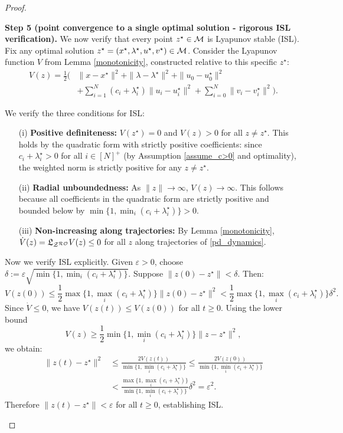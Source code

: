 \documentclass[journal,twoside,web]{ieeecolor}
\newcommand{\purpletext}[1]{\textcolor{proofpurple}{#1}}
\begin{document}
\begin{proof}
\purpletext{\textbf{Step 5 (point convergence to a single optimal solution - rigorous ISL verification).}
We now verify that every point $z^\star \in {\cal M}$ is Lyapunov stable (ISL). Fix any optimal solution $z^\star = (x^\star, \lambda^\star, u^\star, v^\star) \in {\cal M}$.
Consider the Lyapunov function $V$ from Lemma \ref{monotonicity}, constructed relative to this specific $z^\star$:
\begin{align*}
V(z) = \frac{1}{2}\Big(&\|x-x^\star\|^2 + \|\lambda-\lambda^\star\|^2 + \|u_0-u_0^\star\|^2\\
&+ \sum_{i=1}^N(c_i+\lambda_i^\star) \|u_i-u_i^\star\|^2 + \sum_{i=0}^N\|v_i-v_i^\star\|^2\Big).
\end{align*}

We verify the three conditions for ISL:
\begin{enumerate}
\item[(i)] \purpletext{\textbf{Positive definiteness:} $V(z^\star) = 0$ and $V(z) > 0$ for all $z \neq z^\star$. This holds by the quadratic form with strictly positive coefficients: since $c_i + \lambda_i^\star > 0$ for all $i \in [N]^+$ (by Assumption \ref{assume_c>0} and optimality), the weighted norm is strictly positive for any $z \neq z^\star$.}

\item[(ii)] \purpletext{\textbf{Radial unboundedness:} As $\|z\| \to \infty$, $V(z) \to \infty$. This follows because all coefficients in the quadratic form are strictly positive and bounded below by $\min\{1, \min_{i}(c_i + \lambda_i^\star)\} > 0$.}

\item[(iii)] \purpletext{\textbf{Non-increasing along trajectories:} By Lemma \ref{monotonicity}, $\dot{V}(z) = \mathfrak{L}_{{\cal Z}^{\cal RO}}V(z) \leq 0$ for all $z$ along trajectories of \eqref{pd_dynamics}.}
\end{enumerate}

\purpletext{Now we verify ISL explicitly. Given $\varepsilon > 0$, choose $\delta := \varepsilon \sqrt{\min\{1, \min_i(c_i + \lambda_i^\star)\}}$. Suppose $\|z(0) - z^\star\| < \delta$. Then:
\[
V(z(0)) \leq \frac{1}{2}\max\{1, \max_i(c_i + \lambda_i^\star)\} \|z(0) - z^\star\|^2 < \frac{1}{2}\max\{1, \max_i(c_i + \lambda_i^\star)\} \delta^2.
\]
Since $\dot{V} \leq 0$, we have $V(z(t)) \leq V(z(0))$ for all $t \geq 0$. Using the lower bound
\[
V(z) \geq \frac{1}{2}\min\{1, \min_i(c_i + \lambda_i^\star)\} \|z - z^\star\|^2,
\]
we obtain:
\begin{align*}
\|z(t) - z^\star\|^2 &\leq \frac{2V(z(t))}{\min\{1, \min_i(c_i + \lambda_i^\star)\}} \leq \frac{2V(z(0))}{\min\{1, \min_i(c_i + \lambda_i^\star)\}}\\
&< \frac{\max\{1, \max_i(c_i + \lambda_i^\star)\}}{\min\{1, \min_i(c_i + \lambda_i^\star)\}} \delta^2 = \varepsilon^2.
\end{align*}
Therefore $\|z(t) - z^\star\| < \varepsilon$ for all $t \geq 0$, establishing ISL.}

}
\end{proof}
\end{document}
